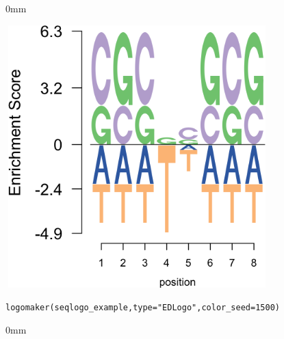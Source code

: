 \documentclass[12pt]{article}\usepackage[]{graphicx}\usepackage[usenames,dvipsnames]{color}
\newcommand{\hlnum}[1]{\textcolor[rgb]{0.816,0.125,0.439}{#1}}%
\newcommand{\hlstr}[1]{\textcolor[rgb]{0.251,0.627,0.251}{#1}}%
\newcommand{\hlstd}[1]{\textcolor[rgb]{0.251,0.251,0.251}{#1}}%
\newcommand{\hlkwc}[1]{\textcolor[rgb]{0.251,0.251,0.251}{#1}}%
\newcommand{\hlkwd}[1]{\textcolor[rgb]{0.878,0.439,0.125}{#1}}%
\newenvironment{knitrout}{}{} %
\begin{document}
\begin{knitrout}
\color{fgcolor}\begin{adjustwidth}{\fltoffset}{0mm}

\includegraphics[width=4in,height=4in]{figure/col_prof-1} \hfill{}

\end{adjustwidth}\begin{kframe}\begin{alltt}
\hlkwd{logomaker}\hlstd{(seqlogo_example,} \hlkwc{type} \hlstd{=} \hlstr{"EDLogo"}\hlstd{,} \hlkwc{color_seed} \hlstd{=} \hlnum{1500}\hlstd{)}
\end{alltt}
\end{kframe}\begin{adjustwidth}{\fltoffset}{0mm}


\end{adjustwidth}
\end{knitrout}
\end{document}

